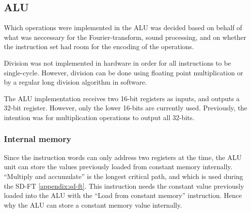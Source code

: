 \FloatBarrier
\subsection{ALU}\label{subsec:fpga-alu}

Which operations were implemented in the ALU was decided based on behalf of what
was neccessary for the Fourier-transform, sound processing, and on whether the
instruction set had room for the encoding of the operations.

Division was not implemented in hardware in order for all instructions to be
single-cycle. However, division can be done using floating point multiplication
or by a regular long division algorithm in software.

The ALU implementation receives two 16-bit registers as inputs, and outputs a
32-bit register. However, only the lower 16-bits are currently used. Previously,
the intention was for multiplication operations to output all 32-bits.

\subsubsection{Internal memory}

Since the instruction words can only address two registers at the time, the ALU
unit can store the values previously loaded from constant memory internally.
``Multiply and accumulate'' is the longest critical path, and which is used
during the SD-FT \ref{appendix:sd-ft}. This instruction needs the constant value
previously loaded into the ALU with the ``Load from constant memory''
instruction. Hence why the ALU can store a constant memory value internally.
